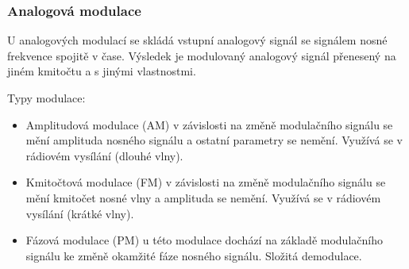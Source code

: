\subsubsection{Analogová modulace}

U analogových modulací se skládá vstupní analogový signál se signálem nosné frekvence spojitě v čase. Výsledek je modulovaný analogový signál přenesený na jiném kmitočtu a s jinými vlastnostmi.

Typy modulace:
\begin{itemize}[noitemsep]
    \item Amplitudová modulace (AM) v závislosti na změně modulačního signálu se mění amplituda nosného signálu a ostatní parametry se nemění. Využívá se v rádiovém vysílání (dlouhé vlny).
    \item Kmitočtová modulace (FM) v závislosti na změně modulačního signálu se mění kmitočet nosné vlny a amplituda se nemění. Využívá se v rádiovém vysílání (krátké vlny).
    \item Fázová modulace (PM) u této modulace dochází na základě modulačního signálu ke změně okamžité fáze nosného signálu. Složitá demodulace. 
\end{itemize}

